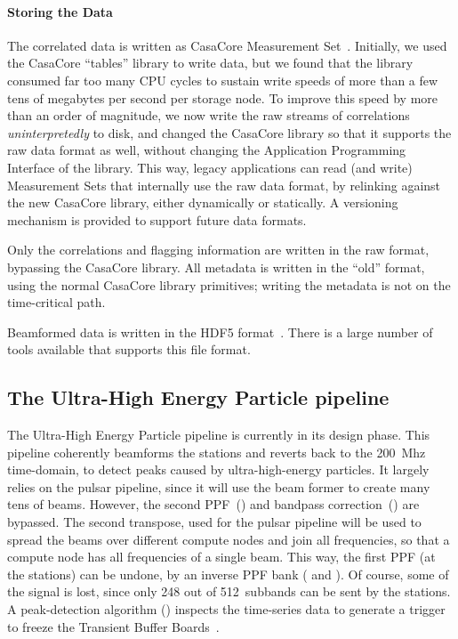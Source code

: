 \paragraph{Storing the Data }
The correlated data is written as CasaCore Measurement Set~\cite{Kemball:00}.
Initially, we used the CasaCore ``tables'' library to write data, but we
found that the library consumed far too many CPU cycles to sustain write
speeds of more than a few tens of megabytes per second per storage node.
To improve this speed by more than an order of magnitude, we now write the
raw streams of correlations \emph{uninterpretedly\/} to disk, and changed
the CasaCore library so that it supports the raw data format as well,
without changing the Application Programming Interface of the library.
This way, legacy applications can read (and write) Measurement Sets that
internally use the raw data format, by relinking against the new CasaCore
library, either dynamically or statically.
A versioning mechanism is provided to support future data formats.

Only the correlations and flagging information are written in the raw
format, bypassing the CasaCore library.
All metadata is written in the ``old'' format, using the normal CasaCore
library primitives; writing the metadata is not on the time-critical path.

Beamformed data is written in the HDF5 format~\cite{?}.
There is a large number of tools available that supports this file format.



\subsection{The Ultra-High Energy Particle pipeline}

The Ultra-High Energy Particle pipeline is currently in its design phase.
This pipeline coherently beamforms the stations and reverts back to the 200~Mhz
time-domain, to detect peaks caused by ultra-high-energy particles.
It largely relies on the pulsar pipeline, since it will use the beam former
to create many tens of beams.
However, the second PPF~() and bandpass
correction~() are bypassed.
The second transpose, used for the pulsar pipeline will be used to spread the
beams over different compute nodes and join all frequencies, so that a compute
node has all frequencies of a single beam.
This way, the first PPF (at the stations) can be undone, by an inverse PPF bank
( and ).
Of course, some of the signal is lost, since only 248 out of 512~subbands can
be sent by the stations.
A peak-detection algorithm () inspects the time-series data
to generate a trigger to freeze the Transient Buffer Boards~\cite{Kooistra:10}.



